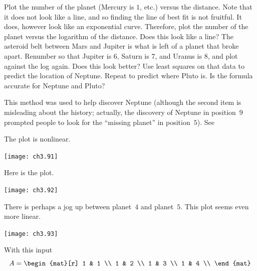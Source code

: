 \begin{exercises}
    \begin{exparts}
      \partsitem Plot the number of the planet 
        (Mercury is \( 1 \), etc.) versus the distance.
        Note that it does not look like a line, and so finding the
        line of best fit is not fruitful.
      \partsitem It does, however look like an exponential curve. 
        Therefore, plot the number of the planet versus the
        logarithm of the distance.
        Does this look like a line?
      \partsitem The asteroid belt between Mars and
        Jupiter is 
        what is left of a planet that broke apart.
        Renumber so that Jupiter is $6$, Saturn is $7$, and Uranus is
        $8$, and plot against the log again.
        Does this look better?
      \partsitem Use least squares on that data to predict the 
       location of Neptune.
      \partsitem Repeat to predict where Pluto is.
      \partsitem Is the formula accurate for Neptune and Pluto? 
    \end{exparts}
    This method was used to help discover Neptune (although the second item is
    misleading about the history; actually, the discovery of Neptune 
    in position~$9$ 
    prompted people to look for the ``missing planet'' in position~$5$).
    See \cite{Gardner70}
      \begin{answer}
        \begin{exparts}
          \partsitem The plot is nonlinear.
            \begin{center}  \small
              \texttt{[image: ch3.91]}
            \end{center}
          \partsitem Here is the plot.
           \begin{center}  \small
             \texttt{[image: ch3.92]}
           \end{center}
           There is perhaps a jog up between planet~$4$ and planet~$5$.
          \partsitem This plot seems even more linear.
           \begin{center}  \small
             \texttt{[image: ch3.93]}
           \end{center}
          \partsitem
            With this input
            \begin{equation*}
              A =  
              \begin{mat}[r]
                1 & 1 \\
                1 & 2 \\
                1 & 3 \\
                1 & 4 \\

\end{mat}
\end{equation*}
\end{exparts}
\end{answer}
\end{exercises}
